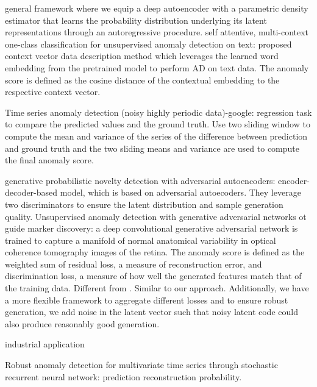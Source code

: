 \documentclass[pmlr]{jmlr}%
\begin{document}
\cite{abati2019latent} general framework where we equip a deep autoencoder with a parametric density estimator that learns the probability distribution underlying its latent representations through an autoregressive procedure.
\cite{ruff2019self} self attentive, multi-context one-class classification for unsupervised anomaly detection on text: proposed context vector data description method which leverages the learned word embedding from the pretrained model to perform AD on text data. The anomaly score is defined as the cosine distance of the contextual embedding to the respective context vector.


\cite{shipmon2017time} Time series anomaly detection (noisy highly periodic data)-google: regression task to compare the predicted values and the ground truth. Use two sliding window to compute the mean and variance of the series of the difference between prediction and ground truth and the two sliding means and variance are used to compute the final anomaly score. 

\cite{pidhorskyi2018generative} generative probabilistic novelty detection with adversarial autoencoders: encoder-decoder-based model, which is based on adversarial autoecoders. They leverage two discriminators to ensure the latent distribution and sample generation quality. 
\cite{schlegl2017unsupervised} Unsupervised anomaly detection with generative adversarial networks ot guide marker discovery: a deep convolutional generative adversarial network is trained to capture a manifold of normal anatomical variability in optical coherence tomography images of the retina. The anomaly score is defined as the weighted sum of residual loss, a measure of reconstruction error, and discrimination loss, a measure of how well the generated features match that of the training data. Different from \cite{schlegl2017unsupervised}.
Similar to our approach. Additionally, we have a more flexible framework to aggregate different losses and to ensure robust generation, we add noise in the latent vector such that noisy latent code could also produce reasonably good generation.


industrial application \cite{su2019robust}

\cite{su2019robust} Robust anomaly detection for multivariate time series through stochastic recurrent neural network: prediction reconstruction probability.
\end{document}
